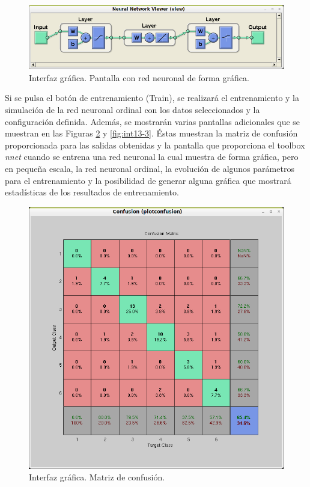 		\begin{figure}[htbp]
			\centering
			\includegraphics[scale=0.5]{interfaz/interface13-1.png}
			\caption{Interfaz gráfica. Pantalla con red neuronal de forma gráfica.}
			\label{fig:int13-1}
		\end{figure}
		
		Si se pulsa el botón de entrenamiento (Train), se realizará el entrenamiento y la simulación de la red neuronal ordinal con los datos seleccionados y la configuración definida. Además, se mostrarán varias pantallas adicionales que se muestran en las Figuras \ref{fig:int13-2} y \ref{fig:int13-3}. Éstas muestran la matriz de confusión proporcionada para las salidas obtenidas y la pantalla que proporciona el toolbox \textit{nnet} cuando se entrena una red neuronal la cual muestra de forma gráfica, pero en pequeña escala, la red neuronal ordinal, la evolución de algunos parámetros para el entrenamiento y la posibilidad de generar alguna gráfica que mostrará estadísticas de los resultados de entrenamiento.\\
		
		\begin{figure}[htbp]
			\centering
			\includegraphics[scale=0.6]{interfaz/interface13-2.png}
			\caption{Interfaz gráfica. Matriz de confusión.}
			\label{fig:int13-2}
		\end{figure}
		
